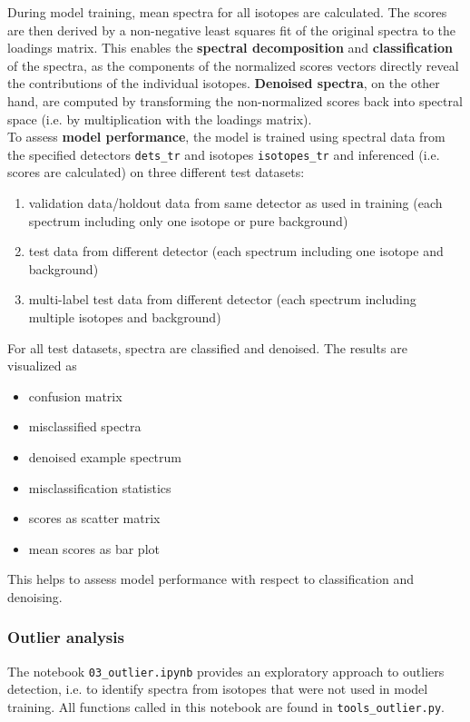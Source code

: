 \documentclass[preprint, 12pt, a4paper]{elsarticle}
\begin{document}
During model training, mean spectra for all isotopes are calculated. The scores are then derived by a non-negative least squares fit of the original spectra to the loadings matrix. This enables the \textbf{spectral decomposition} and \textbf{classification} of the spectra, as the components of the normalized scores vectors directly reveal the contributions of the individual isotopes. \textbf{Denoised spectra}, on the other hand, are computed by transforming the non-normalized scores back into spectral space (i.e. by multiplication with the loadings matrix). \\

To assess \textbf{model performance}, the model is trained using spectral data from the specified detectors \texttt{dets\_tr} and isotopes \texttt{isotopes\_tr} and inferenced (i.e. scores are calculated) on three different test datasets:
\begin{enumerate}
\item validation data/holdout data from same detector as used in training (each spectrum including 
only one isotope or pure background)
\item test data from different detector (each spectrum including one isotope and background)
\item multi-label test data from different detector (each spectrum including multiple isotopes and background)
\end{enumerate}


For all test datasets, spectra are classified and denoised. The results are visualized as 
\begin{itemize}
\item confusion matrix  
\item misclassified spectra  
\item denoised example spectrum  
\item misclassification statistics  
\item scores as scatter matrix  
\item mean scores as bar plot
\end{itemize}
  
This helps to assess model performance with respect to classification and denoising. 

\subsubsection{Outlier analysis}
\label{sec:outlier_analysis}
The notebook \texttt{03\_outlier.ipynb} provides an exploratory approach to outliers detection, i.e. to identify spectra from isotopes that were not used in model training. All functions called in this notebook are found in \texttt{tools\_outlier.py}. 
\end{document}
